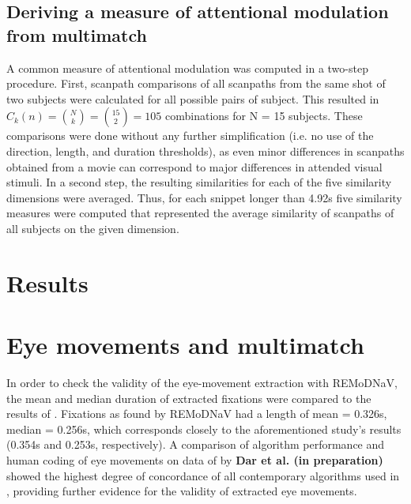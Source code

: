 \documentclass[a4paper, 12pt]{scrreprt}
\begin{document}
\subsection{Deriving a measure of attentional modulation from multimatch}
A common measure of attentional modulation was computed in a two-step procedure. First, scanpath comparisons of all scanpaths from the same shot of two subjects were calculated for all possible pairs of subject. This resulted in $C_k(n) = {N\choose k} = {15\choose 2} = 105$ combinations for N = 15 subjects. These comparisons were done without any further simplification (i.e. no use of the direction, length, and duration thresholds), as even minor differences in scanpaths obtained from a movie can correspond to major differences in attended visual stimuli. In a second step, the resulting similarities for each of the five similarity dimensions were averaged. Thus, for each snippet longer than 4.92s five similarity measures were computed that represented the average similarity of scanpaths of all subjects on the given dimension. 
 
 
 
\section{Results}

\section{Eye movements and multimatch}
In order to check the validity of the eye-movement extraction with REMoDNaV, the mean and median duration of extracted fixations were compared to the results of \textcite{dorr2010variability}. Fixations as found by REMoDNaV had a length of mean = 0.326s, median = 0.256s, which corresponds closely to the aforementioned study's results (0.354s and 0.253s, respectively). A comparison of algorithm performance and human coding of eye movements on data of \textcite{andersson2017one} by \textbf{Dar et al. (in preparation)} showed the highest degree of concordance of all contemporary algorithms used in \textcite{anderson2015comparison}, providing further evidence for the validity of extracted eye movements. \newline
\end{document}
